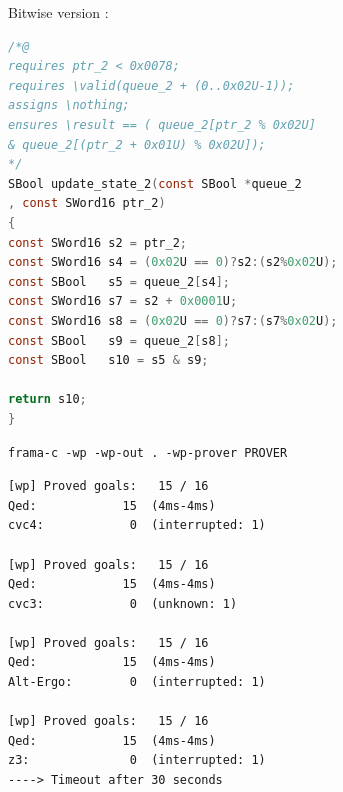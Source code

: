 \documentclass{beamer}
\begin{document}
\begin{frame}[fragile]
	\scriptsize 
	Bitwise version : 
\begin{lstlisting}[language=C]
/*@
requires ptr_2 < 0x0078;
requires \valid(queue_2 + (0..0x02U-1));
assigns \nothing;
ensures \result == ( queue_2[ptr_2 % 0x02U] 
& queue_2[(ptr_2 + 0x01U) % 0x02U]);
*/
SBool update_state_2(const SBool *queue_2
, const SWord16 ptr_2)
{
const SWord16 s2 = ptr_2;
const SWord16 s4 = (0x02U == 0)?s2:(s2%0x02U);
const SBool   s5 = queue_2[s4];
const SWord16 s7 = s2 + 0x0001U;
const SWord16 s8 = (0x02U == 0)?s7:(s7%0x02U);
const SBool   s9 = queue_2[s8];
const SBool   s10 = s5 & s9;

return s10;
}
\end{lstlisting}
	
	
\end{frame}
\begin{frame}[fragile]
	\texttt{frama-c -wp -wp-out . -wp-prover PROVER}
	
\begin{lstlisting}[]
[wp] Proved goals:   15 / 16
Qed:            15  (4ms-4ms)
cvc4:            0  (interrupted: 1)

[wp] Proved goals:   15 / 16
Qed:            15  (4ms-4ms)
cvc3:            0  (unknown: 1)

[wp] Proved goals:   15 / 16
Qed:            15  (4ms-4ms)
Alt-Ergo:        0  (interrupted: 1)

[wp] Proved goals:   15 / 16
Qed:            15  (4ms-4ms)
z3:              0  (interrupted: 1)    
----> Timeout after 30 seconds

\end{lstlisting}
	
\end{frame}
\end{document}
